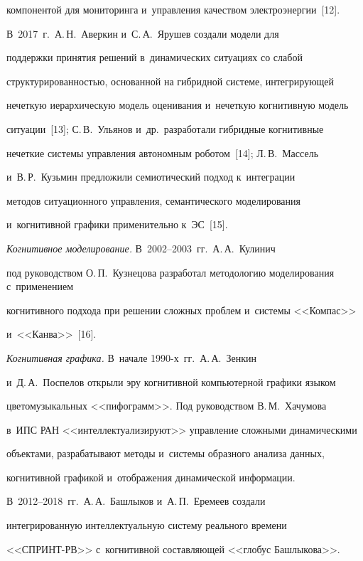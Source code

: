 компонентой для мониторинга и~управления качеством электроэнергии~[12]. 


В~2017~г.\ А.\,Н.~Аверкин и~С.\,А.~Ярушев создали модели для 


поддержки принятия решений в~динамических ситуациях со слабой 


структурированностью, основанной на гибридной системе, интегрирующей 


нечеткую иерархическую модель оценивания и~нечеткую когнитивную модель 


ситуации~[13]; С.\,В.~Ульянов и~др.\ разработали гибридные когнитивные 


нечеткие системы управления автономным роботом~[14]; Л.\,В.~Массель 


и~В.\,Р.~Кузьмин предложили семиотический подход к~интеграции 


методов ситуационного управ\-ле\-ния, семантического моделирования 


и~когнитивной графики применительно к~ЭС~[15].


  


  \textit{Когнитивное моделирование.} В~2002--2003~гг.\ А.\,А.~Кулинич


  под руководством О.\,П.~Кузнецова разработал методологию моделирования с~применением 


когнитивного подхода при решении сложных проблем и~системы <<Компас>> 


и~<<Канва>>~[16]. 


  


  \textit{Когнитивная графика.} В~начале 1990-х~гг.\ А.\,А.~Зенкин 


и~Д.\,А.~Поспелов открыли эру когнитивной компьютерной графики языком 


цветомузыкальных <<пифограмм>>. Под руководством В.\,М.~Хачумова 


в~ИПС РАН <<интеллектуализируют>> управление сложными динамическими 


объектами, разрабатывают методы и~системы образного анализа данных, 


когнитивной графикой и~отображения динамической информации.  


В~2012--2018~гг.\ А.\,А.~Башлыков и~А.\,П.~Еремеев создали 


интегрированную интеллектуальную систему реального времени  


<<СПРИНТ-РВ>> с~когнитивной составляющей <<глобус Башлыкова>>. 


